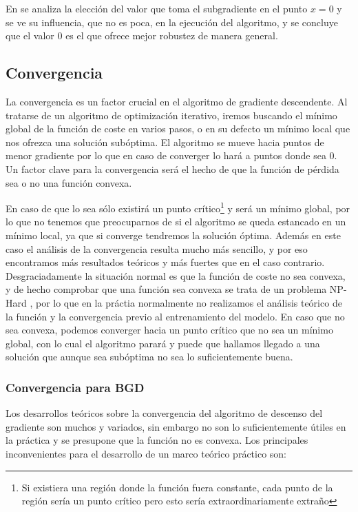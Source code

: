 En \cite{ReLuat0} se analiza la elección del valor que toma el subgradiente en el punto $x=0$ y se ve su influencia, que no es poca, en la ejecución del algoritmo, y se concluye que el valor 0 es el que ofrece mejor robustez de manera general.




\subsection{Convergencia} \label{sec:convergencia}

La convergencia es un factor crucial en el algoritmo de gradiente descendente. Al tratarse de un algoritmo de optimización iterativo, iremos buscando el mínimo global de la función de coste en varios pasos, o en su defecto un mínimo local que nos ofrezca una solución subóptima. El algoritmo se mueve hacia puntos de menor gradiente por lo que en caso de converger lo hará a puntos donde sea 0. Un factor clave para la convergencia será el hecho de que la función de pérdida sea o no una función convexa.

En caso de que lo sea sólo existirá un punto crítico\footnote{Si existiera una región donde la función fuera constante, cada punto de la región sería un punto crítico pero esto sería extraordinariamente extraño} y será un mínimo global, por lo que no tenemos que preocuparnos de si el algoritmo se queda estancado en un mínimo local, ya que si converge tendremos la solución óptima. Además en este caso el análisis de la convergencia resulta mucho más sencillo, y por eso encontramos más resultados teóricos y más fuertes que en el caso contrario. Desgraciadamente la situación normal es que la función de coste no sea convexa, y de hecho comprobar que una función sea convexa se trata de un problema NP-Hard \cite{Ahmadi_2011_NP_Convex}, por lo que en la práctia normalmente no realizamos el análisis teórico de la función y la convergencia previo al entrenamiento del modelo. En caso que no sea convexa, podemos converger hacia un punto crítico que no sea un mínimo global, con lo cual el algoritmo parará y puede que hallamos llegado a una solución que aunque sea subóptima no sea lo suficientemente buena.


\subsubsection{Convergencia para BGD}

Los desarrollos teóricos sobre la convergencia del algoritmo de descenso del gradiente son muchos y variados, sin embargo no son lo suficientemente útiles en la práctica y se presupone que la función no es convexa. Los principales inconvenientes para el desarrollo de un marco teórico práctico son:

